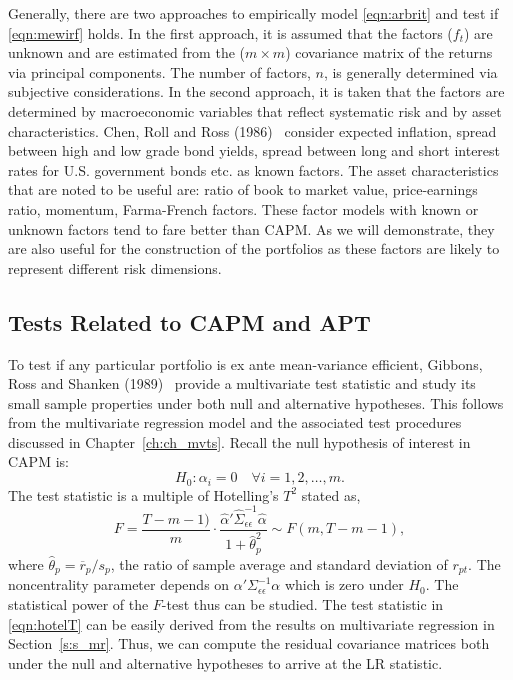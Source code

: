 Generally, there are two approaches to empirically model \eqref{eqn:arbrit} and test if \eqref{eqn:mewirf} holds. In the first approach, it is assumed that the factors ($f_t$) are unknown and are estimated from the ($m \times m$) covariance matrix of the returns via principal components. The number of factors, $n$, is generally determined via subjective considerations. In the second approach, it is taken that the factors are determined by macroeconomic variables that reflect systematic risk and by asset characteristics. Chen, Roll and Ross (1986)~\cite{chenecforce} consider expected inflation, spread between high and low grade bond yields, spread between long and short interest rates for U.S. government bonds etc. as known factors. The asset characteristics that are noted to be useful are: ratio of book to market value, price-earnings ratio, momentum, Farma-French factors. These factor models with known or unknown factors tend to fare better than CAPM. As we will demonstrate, they are also useful for the construction of the portfolios as these factors are likely to represent different risk dimensions. 



\subsection{Tests Related to CAPM and APT}


To test if any particular portfolio is ex ante mean-variance efficient, Gibbons, Ross and Shanken (1989)~\cite{gibbons} provide a multivariate test statistic and study its small sample properties under both null and alternative hypotheses. This follows from the multivariate regression model and the associated test procedures discussed in Chapter~\ref{ch:ch_mvts}. Recall the null hypothesis of interest in CAPM is:
	\begin{equation}\label{eqn:secnull}
	H_0: \alpha_i= 0 \quad \forall i= 1, 2, \ldots, m.
	\end{equation}
The test statistic is a multiple of Hotelling's $T^2$ stated as,
	\begin{equation}\label{eqn:hotelT}
	F= \dfrac{T - m - 1)}{m} \cdot \dfrac{\hat{\alpha}' \hat{\Sigma}_{\epsilon\epsilon}^{-1} \hat{\alpha}}{1+\hat{\theta}_p^2} \sim F(m,T - m - 1),
	\end{equation}	
where $\hat{\theta}_p= \overline{r}_p/s_p$, the ratio of sample average and standard deviation of $r_{pt}$. The noncentrality parameter depends on $\alpha' \Sigma_{\epsilon\epsilon}^{-1} \alpha$ which is zero under $H_0$. The statistical power of the $F$-test thus can be studied. The test statistic in \eqref{eqn:hotelT} can be easily derived from the results on multivariate regression in Section~\ref{s:s_mr}. Thus, we can compute the residual covariance matrices both under the null and alternative hypotheses to arrive at the LR statistic. 


